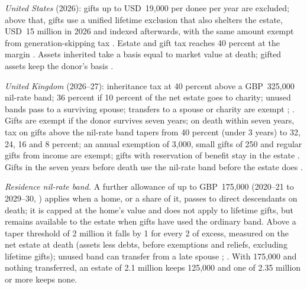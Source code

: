 \begin{qfmethod}\label{meth:wealth-transfer-strategies}
 \emph{United States} (2026): gifts up to USD~19,000 per donee per year are excluded; above that, gifts use a unified lifetime exclusion that also shelters the estate, USD~15 million in 2026 and indexed afterwards, with the same amount exempt from generation-skipping tax \citep[secs.~3.14, 4.42]{irs-rev-proc-2025-32}. Estate and gift tax reaches 40 percent at the margin \citep[sec.~2001(c)]{us-internal-revenue-code-26}. Assets inherited take a basis equal to market value at death; gifted assets keep the donor's basis \citep[secs.~1014(a), 1015(a)]{us-internal-revenue-code-26}.

\emph{United Kingdom} (2026--27): inheritance tax at 40 percent above a GBP~325,000 nil-rate band; 36 percent if 10 percent of the net estate goes to charity; unused bands pass to a surviving spouse; transfers to a spouse or charity are exempt \citep[overview]{govuk-iht-2026}; \citep[thresholds table]{govuk-iht-thresholds-2026}. Gifts are exempt if the donor survives seven years; on death within seven years, tax on gifts above the nil-rate band tapers from 40 percent (under 3 years) to 32, 24, 16 and 8 percent; an annual exemption of 3,000, small gifts of 250 and regular gifts from income are exempt; gifts with reservation of benefit stay in the estate \citep[gifts]{govuk-iht-2026}. Gifts in the seven years before death use the nil-rate band before the estate does \citep[``Gifts and lifetime transfers'']{govuk-rnrb-guidance-2019}.

\emph{Residence nil-rate band.} A further allowance of up to GBP~175,000 (2020--21 to 2029--30, \citep[thresholds table]{govuk-iht-thresholds-2026}) applies when a home, or a share of it, passes to direct descendants on death; it is capped at the home's value and does not apply to lifetime gifts, but remains available to the estate when gifts have used the ordinary band. Above a taper threshold of 2 million it falls by 1 for every 2 of excess, measured on the net estate at death (assets less debts, before exemptions and reliefs, excluding lifetime gifts); unused band can transfer from a late spouse \citep[``Gifts and lifetime transfers''; ``How residence nil rate band tapers'']{govuk-rnrb-guidance-2019}; \citep[IHTM46023]{hmrc-ihtm46023-2026}. With 175,000 and nothing transferred, an estate of 2.1 million keeps 125,000 and one of 2.35 million or more keeps none.


\end{qfmethod}
